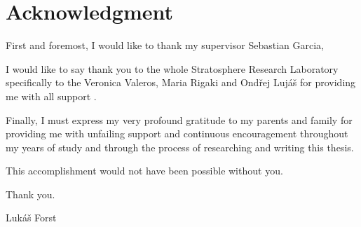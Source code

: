 \vspace*{\fill}

\section*{Acknowledgment}
First and foremost, I would like to thank my supervisor Sebastian Garcia,


I would like to say thank you to the whole Stratosphere Research Laboratory specifically to the Veronica Valeros, Maria Rigaki and Ondřej Lujáš for providing me with all support . 

\noindent
Finally, I must express my very profound gratitude to my parents and family for providing me with unfailing support and continuous encouragement throughout my years of study and through the process of researching and writing this thesis. 

\bigskip \noindent
This accomplishment would not have been possible without you.
  
\bigskip \noindent
Thank you.
  
\bigskip \noindent
\hspace*{\fill} Lukáš Forst

\thispagestyle{empty}

\cleardoublepage